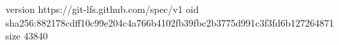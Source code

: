 version https://git-lfs.github.com/spec/v1
oid sha256:882178cdff10c99e204c4a766b4102fb39fbc2b3775d991c3f3fd6b127264871
size 43840
